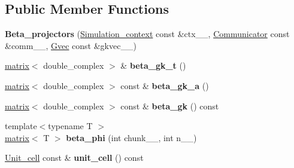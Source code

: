 \subsection*{Public Member Functions}
\begin{DoxyCompactItemize}
\item 
\hypertarget{classsirius_1_1_beta__projectors_a209d524ed59adffbe7cbfb04d5418fa4}{}{\bfseries Beta\+\_\+projectors} (\hyperlink{classsirius_1_1_simulation__context}{Simulation\+\_\+context} const \&ctx\+\_\+\+\_\+, \hyperlink{classsddk_1_1_communicator}{Communicator} const \&comm\+\_\+\+\_\+, \hyperlink{classsddk_1_1_gvec}{Gvec} const \&gkvec\+\_\+\+\_\+)\label{classsirius_1_1_beta__projectors_a209d524ed59adffbe7cbfb04d5418fa4}

\item 
\hypertarget{classsirius_1_1_beta__projectors_a876776a789409556c7dc06d04092bf65}{}\hyperlink{classsddk_1_1mdarray}{matrix}$<$ double\+\_\+complex $>$ \& {\bfseries beta\+\_\+gk\+\_\+t} ()\label{classsirius_1_1_beta__projectors_a876776a789409556c7dc06d04092bf65}

\item 
\hypertarget{classsirius_1_1_beta__projectors_a1a76c3324184762a7a7cd78530ea31b9}{}\hyperlink{classsddk_1_1mdarray}{matrix}$<$ double\+\_\+complex $>$ const \& {\bfseries beta\+\_\+gk\+\_\+a} ()\label{classsirius_1_1_beta__projectors_a1a76c3324184762a7a7cd78530ea31b9}

\item 
\hypertarget{classsirius_1_1_beta__projectors_a07e9849545c744d058f3ceda50907486}{}\hyperlink{classsddk_1_1mdarray}{matrix}$<$ double\+\_\+complex $>$ const \& {\bfseries beta\+\_\+gk} () const \label{classsirius_1_1_beta__projectors_a07e9849545c744d058f3ceda50907486}

\item 
\hypertarget{classsirius_1_1_beta__projectors_a2359c0c1067ba6dd52c09851e2f0b477}{}{\footnotesize template$<$typename T $>$ }\\\hyperlink{classsddk_1_1mdarray}{matrix}$<$ T $>$ {\bfseries beta\+\_\+phi} (int chunk\+\_\+\+\_\+, int n\+\_\+\+\_\+)\label{classsirius_1_1_beta__projectors_a2359c0c1067ba6dd52c09851e2f0b477}

\item 
\hypertarget{classsirius_1_1_beta__projectors_a828c2f91ea365eec81edd93d76f3af46}{}\hyperlink{classsirius_1_1_unit__cell}{Unit\+\_\+cell} const \& {\bfseries unit\+\_\+cell} () const \label{classsirius_1_1_beta__projectors_a828c2f91ea365eec81edd93d76f3af46}


\end{DoxyCompactItemize}
